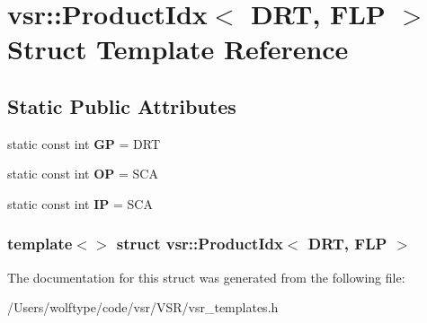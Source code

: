 \hypertarget{structvsr_1_1_product_idx_3_01_d_r_t_00_01_f_l_p_01_4}{\section{vsr\-:\-:Product\-Idx$<$ D\-R\-T, F\-L\-P $>$ Struct Template Reference}
\label{structvsr_1_1_product_idx_3_01_d_r_t_00_01_f_l_p_01_4}
}
\subsection*{Static Public Attributes}
\begin{DoxyCompactItemize}
\item 
\hypertarget{structvsr_1_1_product_idx_3_01_d_r_t_00_01_f_l_p_01_4_a3d8c764c39fad2269c61502db3c86df6}{static const int {\bfseries G\-P} = D\-R\-T}\label{structvsr_1_1_product_idx_3_01_d_r_t_00_01_f_l_p_01_4_a3d8c764c39fad2269c61502db3c86df6}

\item 
\hypertarget{structvsr_1_1_product_idx_3_01_d_r_t_00_01_f_l_p_01_4_aa65422ea2f4583cc1df0c7be32195427}{static const int {\bfseries O\-P} = S\-C\-A}\label{structvsr_1_1_product_idx_3_01_d_r_t_00_01_f_l_p_01_4_aa65422ea2f4583cc1df0c7be32195427}

\item 
\hypertarget{structvsr_1_1_product_idx_3_01_d_r_t_00_01_f_l_p_01_4_a8f4abc9b3d330f46a453aa482722a50b}{static const int {\bfseries I\-P} = S\-C\-A}\label{structvsr_1_1_product_idx_3_01_d_r_t_00_01_f_l_p_01_4_a8f4abc9b3d330f46a453aa482722a50b}

\end{DoxyCompactItemize}
\subsubsection*{template$<$$>$ struct vsr\-::\-Product\-Idx$<$ D\-R\-T, F\-L\-P $>$}



The documentation for this struct was generated from the following file\-:\begin{DoxyCompactItemize}
\item 
/\-Users/wolftype/code/vsr/\-V\-S\-R/vsr\-\_\-templates.\-h\end{DoxyCompactItemize}
